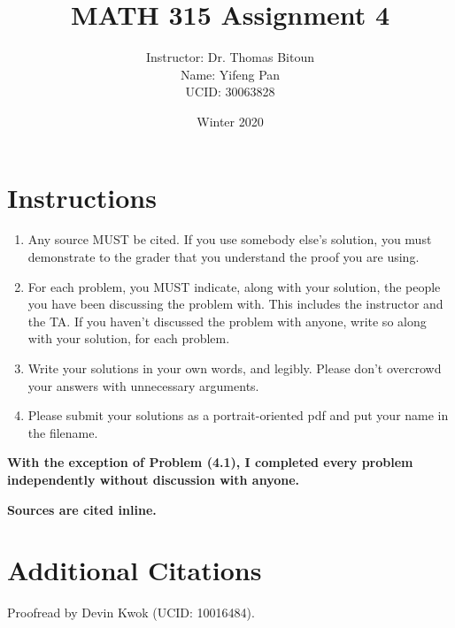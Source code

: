 \documentclass[10pt, letterpaper, titlepage]{article}
\title{MATH 315 Assignment 4}
\author{Instructor: Dr. Thomas Bitoun
    \\Name: Yifeng Pan
    \\UCID: 30063828}
\date{Winter 2020}
\begin{document}
    \maketitle


    \newcommand*\na{\footnote{No additional references used.}}

    \section*{Instructions}
    \begin{enumerate}
        \item Any source MUST be cited. If you use somebody else’s solution, you must demonstrate to the
        grader that you understand the proof you are using.
        \item For each problem, you MUST indicate, along with your solution, the people you have
        been discussing the problem with. This includes the instructor and the TA. If you
        haven’t discussed the problem with anyone, write so along with your solution, for each
        problem.
        \item Write your solutions in your own words, and legibly. Please don’t overcrowd your answers with
        unnecessary arguments.
        \item Please submit your solutions as a portrait-oriented pdf and put your name in the
        filename.
    \end{enumerate}

    \textbf{With the exception of Problem (4.1),
    I completed every problem independently without discussion with anyone.}

    \textbf{Sources are cited inline.}



    \newpage
    
    \newpage
    
    \newpage
    
    \newpage
    

    \section*{Additional Citations}


        Proofread by Devin Kwok
        (UCID: 10016484).
        
\end{document}
